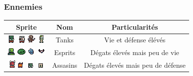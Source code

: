 \documentclass[a4paper, 12pt, twoside]{article}
\begin{document}
\subsubsection{Ennemies}

\begin{table}[H]
    \begin{center}
    \begin{tabular}{ | c | c | c | }
    	\hline
        Sprite & Nom & Particularités\\
    	\hline
        \includegraphics[scale=2]{./Monsters/Orc} \includegraphics[scale=2]{./Monsters/Mask}
        \includegraphics[scale=1.5]{./Monsters/SkeletonKnife} \includegraphics[scale=2]{./Monsters/Zombie} & Tanks & Vie et défense élévés\\
        
        \hline
        \includegraphics[scale=2]{./Monsters/Swamp} 
        \includegraphics[scale=1.4]{./Monsters/Slime}
        \includegraphics[scale=1.9]{./Monsters/Spirit}
        \includegraphics[scale=1.7]{./Monsters/Bat} & Esprits & Dégats élevés mais peu de vie\\
       
        \hline
        \includegraphics[scale=2]{./Monsters/Demon}\includegraphics[scale=2]{./Monsters/Imp}
        \includegraphics[scale=2]{./Monsters/LilGob}
        \includegraphics[scale=2]{./Monsters/LilZombie} & Assasins & Dégats élevés mais peu de défense\\
        

\end{tabular}
\end{center}
\end{table}
\end{document}
